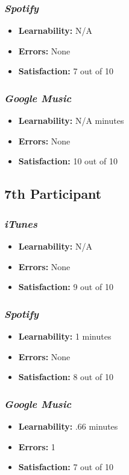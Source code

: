 \documentclass{article}
\begin{document}
\begin{multicols}{2}
\subsubsection{\it Spotify}
\begin{itemize}
	\item {\bf Learnability:} N/A
	\item {\bf Errors:} None
	\item {\bf Satisfaction:} 7 out of 10 
\end{itemize}

\subsubsection{\it Google Music}
\begin{itemize}
\item {\bf Learnability:} N/A minutes
	\item {\bf Errors:} None
	\item {\bf Satisfaction:} 10 out of 10 
\end{itemize}

\subsection{7th Participant}

\subsubsection{\it iTunes}
\begin{itemize}
	\item {\bf Learnability:} N/A
	\item {\bf Errors:}  None
	\item {\bf Satisfaction:} 9 out of 10 
\end{itemize}

\subsubsection{\it Spotify}
\begin{itemize}
	\item {\bf Learnability:} 1 minutes
	\item {\bf Errors:} None
	\item {\bf Satisfaction:} 8 out of 10 
\end{itemize}

\subsubsection{\it Google Music}
\begin{itemize}
\item {\bf Learnability:} .66 minutes
	\item {\bf Errors:} 1
	\item {\bf Satisfaction:} 7 out of 10 
\end{itemize}


\end{multicols}
\end{document}
